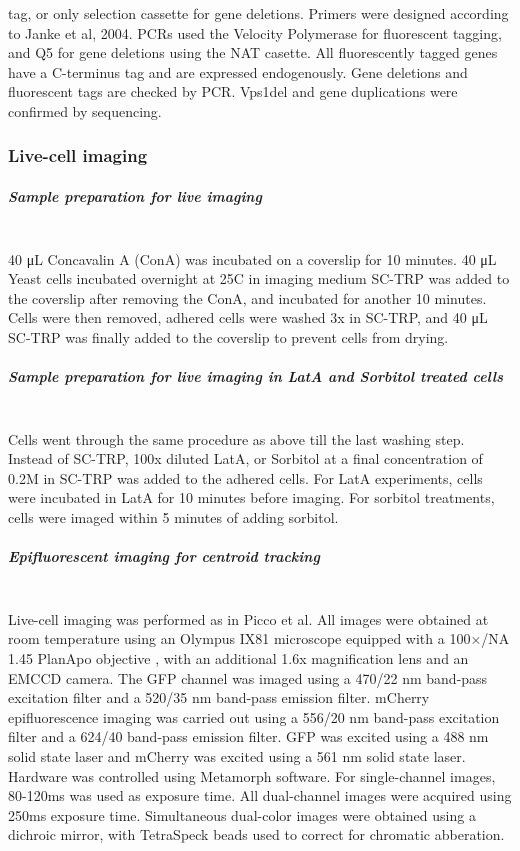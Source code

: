 tag, or only selection cassette for gene deletions. Primers were designed according to Janke et al, 2004. PCRs used the Velocity Polymerase for fluorescent tagging, and Q5 for gene deletions using the NAT casette. 
All fluorescently tagged genes have a C-terminus tag and are expressed endogenously.
Gene deletions and fluorescent tags are checked by PCR. Vps1del and gene duplications were confirmed by sequencing. 

\subsubsection{Live-cell imaging}
\subparagraph{Sample preparation for live imaging}
			\mbox{}\\
40 μL Concavalin A (ConA) was incubated on a coverslip for 10 minutes. 40 μL Yeast cells incubated overnight at 25C in imaging medium SC-TRP was added to the coverslip after removing the ConA, and incubated for another 10 minutes. Cells were then removed, adhered cells were washed 3x in SC-TRP, and 40 μL SC-TRP was finally added to the coverslip to prevent cells from drying. 

\subparagraph{Sample preparation for live imaging in LatA and Sorbitol treated cells}
\mbox{}\\
Cells went through the same procedure as above till the last washing step. Instead of SC-TRP, 100x diluted LatA, or Sorbitol at a final concentration of 0.2M in SC-TRP was added to the adhered cells. For LatA experiments, cells were incubated in LatA for 10 minutes before imaging. For sorbitol treatments, cells were imaged within 5 minutes of adding sorbitol.

\subparagraph{Epifluorescent imaging for centroid tracking}
			\mbox{}\\
Live-cell imaging was performed as in Picco et al. All images were obtained at room temperature using an Olympus IX81 microscope equipped with a 100×/NA 1.45 PlanApo objective , with an additional 1.6x magnification lens and an EMCCD camera. The GFP channel was imaged using a 470/22 nm band-pass excitation filter and a 520/35 nm band-pass emission filter. mCherry epifluorescence imaging was carried out using a 556/20 nm band-pass excitation filter and a 624/40 band-pass emission filter. GFP was excited using a 488 nm solid state laser and mCherry was excited using a 561 nm solid state laser. Hardware was controlled using Metamorph software. For single-channel images, 80-120ms was used as exposure time. All dual-channel images were acquired using 250ms exposure time. Simultaneous dual-color images were obtained using a dichroic mirror, with TetraSpeck beads used to correct for chromatic abberation.

